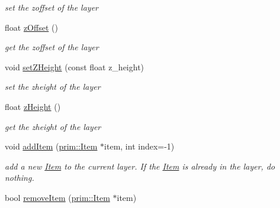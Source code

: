 \begin{DoxyCompactItemize}
\begin{DoxyCompactList}\small\item\em set the zoffset of the layer \end{DoxyCompactList}\item 
float \hyperlink{classprim_1_1Layer_a7ae3cbed96ce075e56e444538805ed09}{z\+Offset} ()\hypertarget{classprim_1_1Layer_a7ae3cbed96ce075e56e444538805ed09}{}\label{classprim_1_1Layer_a7ae3cbed96ce075e56e444538805ed09}

\begin{DoxyCompactList}\small\item\em get the zoffset of the layer \end{DoxyCompactList}\item 
void \hyperlink{classprim_1_1Layer_a5947e3dc1ad3a3d7657b6bf7cc3ed439}{set\+Z\+Height} (const float z\+\_\+height)\hypertarget{classprim_1_1Layer_a5947e3dc1ad3a3d7657b6bf7cc3ed439}{}\label{classprim_1_1Layer_a5947e3dc1ad3a3d7657b6bf7cc3ed439}

\begin{DoxyCompactList}\small\item\em set the zheight of the layer \end{DoxyCompactList}\item 
float \hyperlink{classprim_1_1Layer_a04fba2a5c8347f7a249b28018581018f}{z\+Height} ()\hypertarget{classprim_1_1Layer_a04fba2a5c8347f7a249b28018581018f}{}\label{classprim_1_1Layer_a04fba2a5c8347f7a249b28018581018f}

\begin{DoxyCompactList}\small\item\em get the zheight of the layer \end{DoxyCompactList}\item 
void \hyperlink{classprim_1_1Layer_a688a2d06a43c128f9e98dc60e3b0157e}{add\+Item} (\hyperlink{classprim_1_1Item}{prim\+::\+Item} $\ast$item, int index=-\/1)\hypertarget{classprim_1_1Layer_a688a2d06a43c128f9e98dc60e3b0157e}{}\label{classprim_1_1Layer_a688a2d06a43c128f9e98dc60e3b0157e}

\begin{DoxyCompactList}\small\item\em add a new \hyperlink{classprim_1_1Item}{Item} to the current layer. If the \hyperlink{classprim_1_1Item}{Item} is already in the layer, do nothing. \end{DoxyCompactList}\item 
bool \hyperlink{classprim_1_1Layer_a760643f11d83c0c9f841de211787f7cc}{remove\+Item} (\hyperlink{classprim_1_1Item}{prim\+::\+Item} $\ast$item)\hypertarget{classprim_1_1Layer_a760643f11d83c0c9f841de211787f7cc}{}\label{classprim_1_1Layer_a760643f11d83c0c9f841de211787f7cc}


\end{DoxyCompactItemize}
